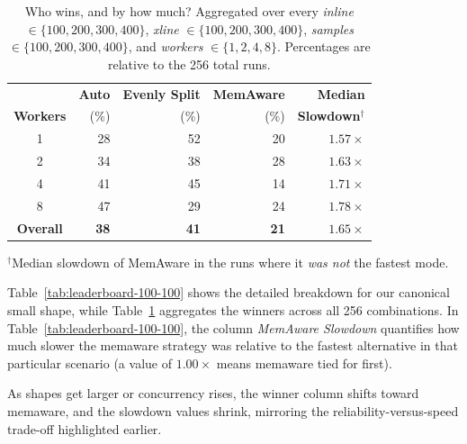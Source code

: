 \begin{table}[ht]
    \centering
    \caption{Who wins, and by how much? Aggregated over every
    \textit{inline} $\in\{100,200,300,400\}$,
        \textit{xline} $\in\{100,200,300,400\}$,
        \textit{samples} $\in\{100,200,300,400\}$,
        and \textit{workers} $\in\{1,2,4,8\}$.
        Percentages are relative to the 256 total runs.}
    \label{tab:leaderboard-summary}
    \begin{tabular}{crrrr}
        \toprule
        & \textbf{Auto} & \textbf{Evenly Split} & \textbf{MemAware} & \textbf{Median}             \\
        \textbf{Workers} & (\%)          & (\%)                  & (\%)              & \textbf{Slowdown$^\dagger$} \\
        \midrule
        1                & 28            & 52                    & 20                & $1.57\times$                \\
        2                & 34            & 38                    & 28                & $1.63\times$                \\
        4                & 41            & 45                    & 14                & $1.71\times$                \\
        8                & 47            & 29                    & 24                & $1.78\times$                \\
        \midrule
        \textbf{Overall} & \textbf{38}   & \textbf{41}           & \textbf{21}       & $1.65\times$                \\
        \bottomrule
    \end{tabular}

    \vspace{0.5em}
    \footnotesize
    $^\dagger$Median slowdown of MemAware in the runs where it \emph{was not} the fastest mode.
\end{table}

\noindent
Table~\ref{tab:leaderboard-100-100} shows the detailed breakdown for our canonical small shape, while Table~\ref{tab:leaderboard-summary} aggregates the winners across all 256 combinations.
In Table~\ref{tab:leaderboard-100-100}, the column \emph{MemAware Slowdown} quantifies how much slower the memaware strategy was relative to the fastest alternative in that particular scenario (a value of $1.00\times$ means memaware tied for first).

As shapes get larger or concurrency rises, the winner column shifts toward memaware, and the slowdown values shrink, mirroring the reliability-versus-speed trade-off highlighted earlier.


